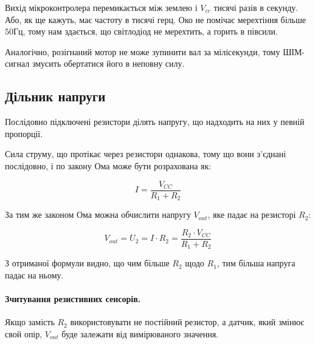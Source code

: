 \documentclass[12pt,a4paper]{report}  %
\begin{document}
Вихід мікроконтролера перемикається між землею і $V_{cc}$ тисячі разів в секунду. Або, як ще кажуть, має частоту в тисячі герц. Око не помічає мерехтіння більше $50 \text{Гц}$, тому нам здається, що світлодіод не мерехтить, а горить в півсили.

Аналогічно, розігнаний мотор не може зупинити вал за мілісекунди, тому ШІМ-сигнал змусить обертатися його в неповну силу.

\subsection{Дільник напруги}

Послідовно підключені резистори ділять напругу, що надходить на них у певній пропорції.

Сила струму, що протікає через резистори однакова, тому що вони з'єднані послідовно, і по закону Ома може бути розрахована як:

$$ I = \dfrac{V_{CC}}{R_1 + R_2} $$

За тим же законом Ома можна обчислити напругу $V_{out}$, яке падає на резисторі $R_2$:

$$ V_{out} = U_2 = I \cdot R_2 = \frac {R_2 \cdot V_{CC}}{R_1 + R_2} $$

З отриманої формули видно, що чим більше $R_2$ щодо $R_1$, тим більша напруга падає на ньому.

\paragraph{Зчитування резистивних сенсорів.}

Якщо замість $R_2$ використовувати не постійний резистор, а датчик, який змінює свой опір, $V_{out}$ буде залежати від вимірюваного значення.

\begin{figure}[h!]
\label{ris:image}
\end{figure}
\end{document}
